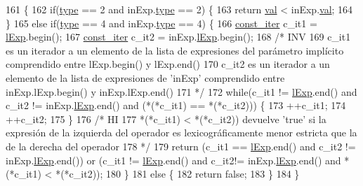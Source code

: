 \begin{DoxyCode}
161 \{
162   \textcolor{keywordflow}{if}(\hyperlink{class_expression_a2c094b93c4863b1f851ea2136aae9612}{type} == 2 and inExp.\hyperlink{class_expression_a2c094b93c4863b1f851ea2136aae9612}{type} == 2) \{
163     \textcolor{keywordflow}{return} \hyperlink{class_expression_a9c15b529b5d59e6bffb3855e384c04aa}{val} < inExp.\hyperlink{class_expression_a9c15b529b5d59e6bffb3855e384c04aa}{val};
164   \}
165   \textcolor{keywordflow}{else} \textcolor{keywordflow}{if}(\hyperlink{class_expression_a2c094b93c4863b1f851ea2136aae9612}{type} == 4 and inExp.\hyperlink{class_expression_a2c094b93c4863b1f851ea2136aae9612}{type} == 4) \{
166     \hyperlink{_expression_8cc_a6ff59711533978050143f1bfb54c33b1}{const\_iter} c\_it1 = \hyperlink{class_expression_afb4f4617291f7e182cbf2252151b122a}{lExp}.begin();
167     \hyperlink{_expression_8cc_a6ff59711533978050143f1bfb54c33b1}{const\_iter} c\_it2 = inExp.\hyperlink{class_expression_afb4f4617291f7e182cbf2252151b122a}{lExp}.begin();
168     \textcolor{comment}{/* INV}
169 \textcolor{comment}{      c\_it1 es un iterador a un elemento de la lista de expresiones del parámetro implícito comprendido
       entre lExp.begin() y lExp.end()}
170 \textcolor{comment}{      c\_it2 es un iterador a un elemento de la lista de expresiones de 'inExp' comprendido entre
       inExp.lExp.begin() y inExp.lExp.end()}
171 \textcolor{comment}{    */}
172     \textcolor{keywordflow}{while}(c\_it1 != \hyperlink{class_expression_afb4f4617291f7e182cbf2252151b122a}{lExp}.end() and c\_it2 != inExp.\hyperlink{class_expression_afb4f4617291f7e182cbf2252151b122a}{lExp}.end() and (*(*c\_it1) == *(*c\_it2))) \{
173       ++c\_it1;
174       ++c\_it2;
175     \}
176     \textcolor{comment}{/* HI}
177 \textcolor{comment}{      *(*c\_it1) < *(*c\_it2)) devuelve 'true' si la expresión de la izquierda del operador es
       lexicográficamente menor estricta que la de la derecha del operador}
178 \textcolor{comment}{    */}
179     \textcolor{keywordflow}{return} (c\_it1 == \hyperlink{class_expression_afb4f4617291f7e182cbf2252151b122a}{lExp}.end() and c\_it2 != inExp.\hyperlink{class_expression_afb4f4617291f7e182cbf2252151b122a}{lExp}.end()) or (c\_it1 != 
      \hyperlink{class_expression_afb4f4617291f7e182cbf2252151b122a}{lExp}.end() and c\_it2!= inExp.\hyperlink{class_expression_afb4f4617291f7e182cbf2252151b122a}{lExp}.end() and *(*c\_it1) < *(*c\_it2));
180   \}
181   \textcolor{keywordflow}{else} \{
182     \textcolor{keywordflow}{return} \textcolor{keyword}{false};
183   \}
184 \}
\end{DoxyCode}
